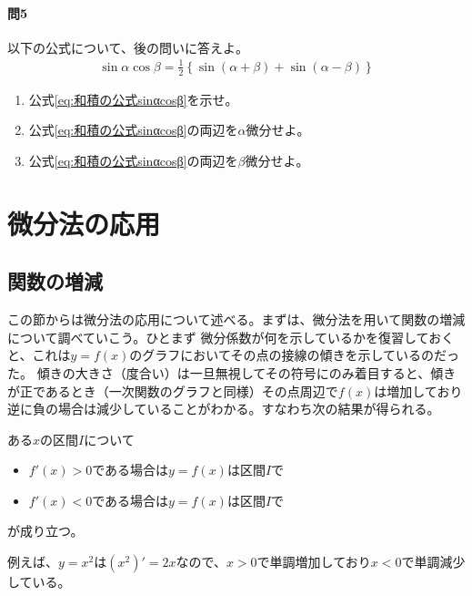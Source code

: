 \documentclass[a4j,dvipdfmx]{jsarticle}
\begin{document}
                \paragraph{問5}以下の公式について、後の問いに答えよ。
                \begin{eqnarray}
                    \sin\alpha\cos\beta=\frac{1}{2}\left\{\sin(\alpha+\beta)+\sin(\alpha-\beta)\right\}\label{eq:和積の公式sinαcosβ}
                \end{eqnarray}
                \begin{enumerate}\setcounter{enumi}{0}\renewcommand{\labelenumi}{(\arabic{enumi})}
                    \item 公式\eqref{eq:和積の公式sinαcosβ}を示せ。
                    \item 公式\eqref{eq:和積の公式sinαcosβ}の両辺を$\alpha$微分せよ。
                    \item 公式\eqref{eq:和積の公式sinαcosβ}の両辺を$\beta$微分せよ。
                \end{enumerate}
                
            \clearpage
            \section{微分法の応用}
                \subsection{関数の増減}
                    この節からは微分法の応用について述べる。まずは、微分法を用いて関数の増減について調べていこう。ひとまず
                    微分係数が何を示しているかを復習しておくと、これは$y=f(x)$のグラフにおいてその点の接線の傾きを示しているのだった。
                    傾きの大きさ（度合い）は一旦無視してその符号にのみ着目すると、傾きが正であるとき（一次関数のグラフと同様）その点周辺で$f(x)$は増加しており
                    逆に負の場合は減少していることがわかる。すなわち次の結果が得られる。
                    \begin{screen}
                        ある$x$の区間$I$について
                        \begin{itemize}
                            \item $f'(x)>0$である場合は$y=f(x)$は区間$I$で
                            \item $f'(x)<0$である場合は$y=f(x)$は区間$I$で
                        \end{itemize}
                        が成り立つ。
                    \end{screen}
                    例えば、$y=x^2$は$(x^2)'=2x$なので、$x>0$で単調増加しており$x<0$で単調減少している。
\end{document}
